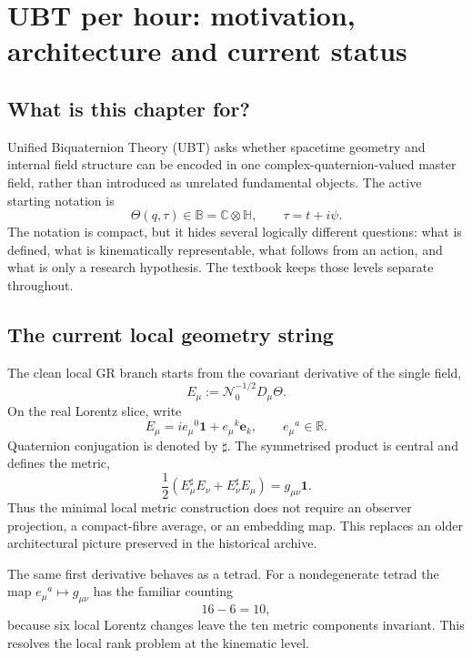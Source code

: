
\chapter{UBT per hour: motivation, architecture and current status}
\label{ch:overview}

\section{What is this chapter for?}
Unified Biquaternion Theory (UBT) asks whether spacetime geometry and internal
field structure can be encoded in one complex-quaternion-valued master field,
rather than introduced as unrelated fundamental objects.  The active starting
notation is
\[
 \Theta(q,\tau)\in\mathbb B=\mathbb C\otimes\mathbb H,
 \qquad \tau=t+i\psi .
\]
The notation is compact, but it hides several logically different questions:
what is defined, what is kinematically representable, what follows from an
action, and what is only a research hypothesis.  The textbook keeps those
levels separate throughout.

\section{The current local geometry string}
The clean local GR branch starts from the covariant derivative of the single
field,
\[
 E_\mu:=\mathcal N_0^{-1/2}D_\mu\Theta .
\]
On the real Lorentz slice, write
\[
 E_\mu=i e_\mu{}^0\mathbf1+e_\mu{}^k\mathbf e_k,
 \qquad e_\mu{}^a\in\mathbb R.
\]
Quaternion conjugation is denoted by $\sharp$.  The symmetrised product is
central and defines the metric,
\[
 \boxed{
 \frac12\left(E_\mu^\sharp E_\nu+E_\nu^\sharp E_\mu\right)
 =g_{\mu\nu}\mathbf1 .}
\]
Thus the minimal local metric construction does not require an observer
projection, a compact-fibre average, or an embedding map.  This replaces an
older architectural picture preserved in the historical archive.

The same first derivative behaves as a tetrad.  For a nondegenerate tetrad the
map $e_\mu{}^a\mapsto g_{\mu\nu}$ has the familiar counting
\[
 16-6=10,
\]
because six local Lorentz changes leave the ten metric components invariant.
This resolves the local rank problem at the kinematic level.

